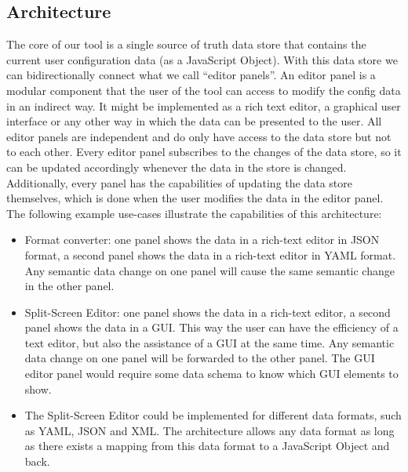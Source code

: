 \subsection{Architecture}\label{subsec:architecture} %
The core of our tool is a single source of truth data store that contains the current user configuration data (as a JavaScript Object).
With this data store we can bidirectionally connect what we call ``editor panels''.
An editor panel is a modular component that the user of the tool can access to modify the config data in an indirect way.
It might be implemented as a rich text editor, a graphical user interface or any other way in which the data can be presented to the user.
All editor panels are independent and do only have access to the data store but not to each other.
Every editor panel subscribes to the changes of the data store, so it can be updated accordingly whenever the data in the store is changed.
Additionally, every panel has the capabilities of updating the data store themselves, which is done when the user modifies the data in the editor panel.
The following example use-cases illustrate the capabilities of this architecture:

\begin{itemize}
    \item Format converter: one panel shows the data in a rich-text editor in JSON format, a second panel shows the data in a rich-text editor in YAML format. Any semantic data change on one panel will cause the same semantic change in the other panel.
    \item Split-Screen Editor: one panel shows the data in a rich-text editor, a second panel shows the data in a GUI. This way the user can have the efficiency of a text editor, but also the assistance of a GUI at the same time. Any semantic data change on one panel will be forwarded to the other panel. The GUI editor panel would require some data schema to know which GUI elements to show.
    \item The Split-Screen Editor could be implemented for different data formats, such as YAML, JSON and XML. The architecture allows any data format as long as there exists a mapping from this data format to a JavaScript Object and back.
\end{itemize}


